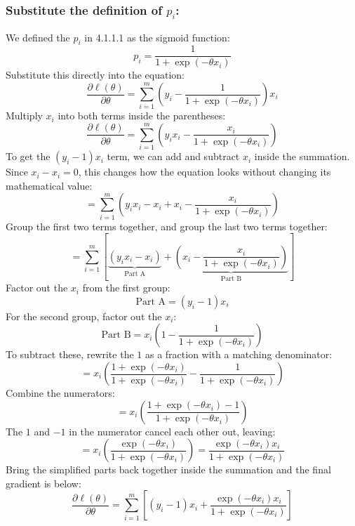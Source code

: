 \documentclass[twoside, 10pt]{article}
\begin{document}
\subsubsection{Substitute the definition of $p_i$:}
We defined the $p_i$ in 4.1.1.1 as the sigmoid function: 
\[
p_i = \frac{1}{1 + \exp(-\theta x_i)}
\]
Substitute this directly into the equation:
\[
\frac{\partial \ell(\theta)}{\partial \theta} = \sum_{i=1}^m \left( y_i - \frac{1}{1 + \exp(-\theta x_i)} \right) x_i
\]
Multiply $x_i$ into both terms inside the parentheses:
\[
\frac{\partial \ell(\theta)}{\partial \theta} = \sum_{i=1}^m \left( y_i x_i - \frac{x_i}{1 + \exp(-\theta x_i)} \right)
\]
To get the $(y_i - 1)x_i$ term, we can add and subtract $x_i$ inside the summation. Since $x_i - x_i = 0$, this changes how the equation looks without changing its mathematical value:
\[
= \sum_{i=1}^m \left( y_i x_i - x_i + x_i - \frac{x_i}{1 + \exp(-\theta x_i)} \right)
\]
Group the first two terms together, and group the last two terms together:
\[
= \sum_{i=1}^m \left[ \underbrace{(y_i x_i - x_i)}_{\text{Part A}} + \underbrace{\left( x_i - \frac{x_i}{1 + \exp(-\theta x_i)} \right)}_{\text{Part B}} \right]
\]
Factor out the $x_i$ from the first group:
\[
\text{Part A} = (y_i - 1)x_i
\]
For the second group, factor out the $x_i$:
\[
\text{Part B} = x_i \left( 1 - \frac{1}{1 + \exp(-\theta x_i)} \right)
\]
To subtract these, rewrite the $1$ as a fraction with a matching denominator:
\[
= x_i \left( \frac{1 + \exp(-\theta x_i)}{1 + \exp(-\theta x_i)} - \frac{1}{1 + \exp(-\theta x_i)} \right)
\]
Combine the numerators:
\[
= x_i \left( \frac{1 + \exp(-\theta x_i) - 1}{1 + \exp(-\theta x_i)} \right)
\]
The $1$ and $-1$ in the numerator cancel each other out, leaving:
\[
= x_i \left( \frac{\exp(-\theta x_i)}{1 + \exp(-\theta x_i)} \right) = \frac{\exp(-\theta x_i) x_i}{1 + \exp(-\theta x_i)}
\]
Bring the simplified parts back together inside the summation and the final gradient is below:
\[
\frac{\partial \ell(\theta)}{\partial \theta} = \sum_{i=1}^m \left[ (y_i - 1) x_i + \frac{\exp(-\theta x_i) x_i}{1 + \exp(-\theta x_i)} \right]
\]
\end{document}

